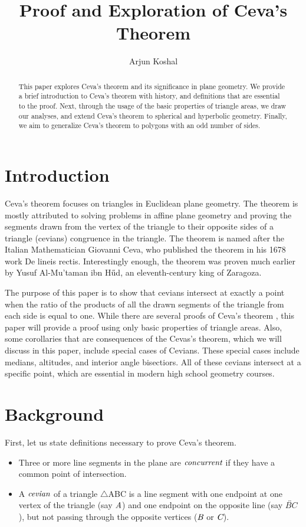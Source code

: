 \documentclass[12pt,a4paper,reqno,parskip=full]{amsart}
\numberwithin{equation}{section}
\theoremstyle{plain}
\theoremstyle{definition}
\begin{document}
\title{Proof and Exploration of Ceva's Theorem}

\author{Arjun Koshal}

\begin{abstract}
This paper explores Ceva's theorem and its significance in plane geometry. We provide a brief introduction to Ceva's theorem with history, and definitions that are essential to the proof. Next, through the usage of the basic properties of triangle areas, we draw our analyses, and extend Ceva's theorem to spherical and hyperbolic geometry. Finally, we aim to generalize Ceva's theorem to polygons with an odd number of sides.
\end{abstract}

\maketitle

\section{Introduction}
Ceva's theorem focuses on triangles in Euclidean plane geometry. The theorem is mostly attributed to solving problems in affine plane geometry and proving the segments drawn from the vertex of the triangle to their opposite sides of a triangle (cevians) congruence in the triangle. The theorem is named after the Italian Mathematician Giovanni Ceva, who published the theorem in his 1678 work De lineis rectis. Interestingly enough, the theorem was proven much earlier by Yusuf Al-Mu'taman ibn Hűd, an eleventh-century king of Zaragoza. \cite{1}

The purpose of this paper is to show that cevians intersect at exactly a point when the ratio of the products of all the drawn segments of the triangle from each side is equal to one. While there are several proofs of Ceva's theorem \cite{2}, this paper will provide a proof using only basic properties of triangle areas. Also, some corollaries that are consequences of the Cevas’s theorem, which we will discuss in this paper, include special cases of Cevians. These special cases include medians, altitudes, and interior angle bisectiors. All of these cevians intersect at a specific point, which are essential in modern high school geometry courses.

\section{Background}
First, let us state definitions necessary to prove Ceva's theorem. 
\begin{itemize}
  \item Three or more line segments in the plane are $\emph{concurrent}$ if they have a common point of intersection.
  \item A $\emph{cevian}$ of a triangle $\triangle$ABC is a line segment with one endpoint at one vertex of the triangle (say $\emph{A}$) and one endpoint on the opposite line (say $\overleftrightarrow{BC}$), but not passing through the opposite vertices ($\emph{B}$ or $\emph{C}$).
\end{itemize}
\end{document}

